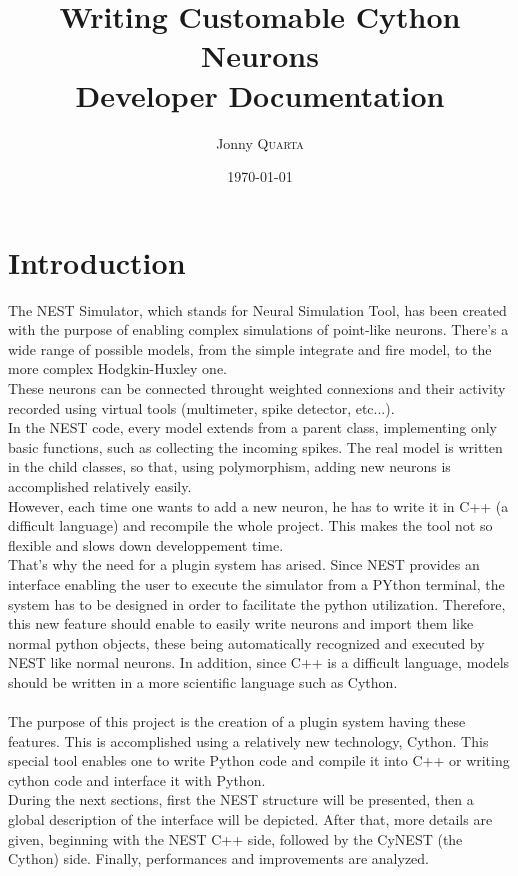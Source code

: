 \documentclass{article}
\title{Writing Customable Cython Neurons \\ Developer Documentation} %
\author{Jonny \textsc{Quarta}} %
\date{\today} %
\begin{document}
\maketitle %


\setlength\parindent{0pt} %

\renewcommand{\labelenumi}{\alph{enumi}.} %

\section{Introduction}
The NEST Simulator, which stands for Neural Simulation Tool, has been created with the purpose of enabling complex simulations of point-like neurons. There's a wide range of possible models, from the simple integrate and fire model, to the more complex Hodgkin-Huxley one.\\
These neurons can be connected throught weighted connexions and their activity recorded using virtual tools (multimeter, spike detector, etc...).\\

In the NEST code, every model extends from a parent class, implementing only basic functions, such as collecting the incoming spikes. The real model is written in the child classes, so that, using polymorphism, adding new neurons is accomplished relatively easily.\\
However, each time one wants to add a new neuron, he has to write it in C++ (a difficult language) and recompile the whole project. This makes the tool not so flexible and slows down developpement time.\\
That's why the need for a plugin system has arised. Since NEST provides an interface enabling the user to execute the simulator from a PYthon terminal, the system has to be designed in order to facilitate the python utilization.
Therefore, this new feature should enable to easily write neurons and import them like normal python objects, these being automatically recognized and executed by NEST like normal neurons. In addition, since C++ is a difficult language, models should be written in a more scientific language such as Cython.\\ \\
The purpose of this project is the creation of a plugin system having these features. This is accomplished using a relatively new technology, Cython. This special tool enables one to write Python code and compile it into C++ or writing cython code and interface it with Python.\\
During the next sections, first the NEST structure will be presented, then a global description of the interface will be depicted. After that, more details are given, beginning with the NEST C++ side, followed by the CyNEST (the Cython) side. Finally, performances and improvements are analyzed.
\end{document}
